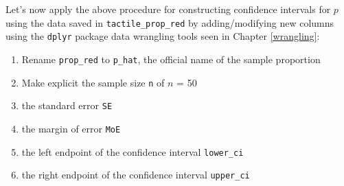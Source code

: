 \documentclass[12pt, krantz2,]{krantz}
\makeatletter
\newenvironment{Shaded}{\begin{snugshade}}{\end{snugshade}}
\newcommand{\DataTypeTok}[1]{\textcolor[rgb]{0.27,0.27,0.27}{#1}}
\newcommand{\DecValTok}[1]{\textcolor[rgb]{0.06,0.06,0.06}{#1}}
\newcommand{\FloatTok}[1]{\textcolor[rgb]{0.06,0.06,0.06}{#1}}
\newcommand{\KeywordTok}[1]{\textcolor[rgb]{0.27,0.27,0.27}{\textbf{#1}}}
\newcommand{\NormalTok}[1]{#1}
\newcommand{\OperatorTok}[1]{\textcolor[rgb]{0.43,0.43,0.43}{\textbf{#1}}}
\newcommand{\StringTok}[1]{\textcolor[rgb]{0.5,0.5,0.5}{#1}}
\providecommand{\tightlist}{%
  \setlength{\itemsep}{0pt}\setlength{\parskip}{0pt}}
\newenvironment{kframe}{%
\medskip{}
\setlength{\fboxsep}{.8em}
 \def\at@end@of@kframe{}%
 \ifinner\ifhmode%
  \def\at@end@of@kframe{\end{minipage}}%
  \begin{minipage}{\columnwidth}%
 \fi\fi%
 \def\FrameCommand##1{\hskip\@totalleftmargin \hskip-\fboxsep
 \colorbox{shadecolor}{##1}\hskip-\fboxsep
     \hskip-\linewidth \hskip-\@totalleftmargin \hskip\columnwidth}%
 \MakeFramed {\advance\hsize-\width
   \@totalleftmargin\z@ \linewidth\hsize
   \@setminipage}}%
 {\par\unskip\endMakeFramed%
 \at@end@of@kframe}
\renewenvironment{Shaded}{\begin{kframe}}{\end{kframe}}
\makeatother
\begin{document}
Let's now apply the above procedure for constructing confidence intervals for \(p\) using the data saved in \texttt{tactile\_prop\_red} by adding/modifying new columns using the \texttt{dplyr} package data wrangling tools seen in Chapter \ref{wrangling}:

\begin{enumerate}
\def\labelenumi{\arabic{enumi}.}
\tightlist
\item
  Rename \texttt{prop\_red} to \texttt{p\_hat}, the official name of the sample proportion
\item
  Make explicit the sample size \texttt{n} of \(n\) = 50
\item
  the standard error \texttt{SE}
\item
  the margin of error \texttt{MoE}
\item
  the left endpoint of the confidence interval \texttt{lower\_ci}
\item
  the right endpoint of the confidence interval \texttt{upper\_ci}
\end{enumerate}

\begin{Shaded}
\end{Shaded}

\begingroup\fontsize{10}{12}\selectfont
\end{document}
